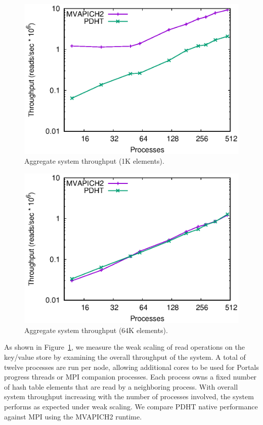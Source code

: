 \begin{figure}
    \centering
    \includegraphics[width=.9\linewidth]{plots/scaling1k}
    \caption{Aggregate system throughput (1K elements).}
    \label{fig:throughput-small}
\end{figure}

\begin{figure}
    \centering
    \includegraphics[width=.9\linewidth]{plots/scaling64}
    \caption{Aggregate system throughput (64K elements).}
    \label{fig:throughput-big}
\end{figure}

As shown in Figure~\ref{fig:throughput-small}, we measure the weak scaling
of \pdht read operations on the key/value store by examining the
overall throughput of the system. A total of twelve processes are run per node, allowing
additional cores to be used for Portals progress threads or MPI companion processes.  Each process owns a fixed number of
hash table elements that are read by a neighboring process. With overall
system throughput increasing with the number of processes involved, 
the system performs as expected under weak scaling. We compare
PDHT native performance against MPI using the MVAPICH2 runtime.

